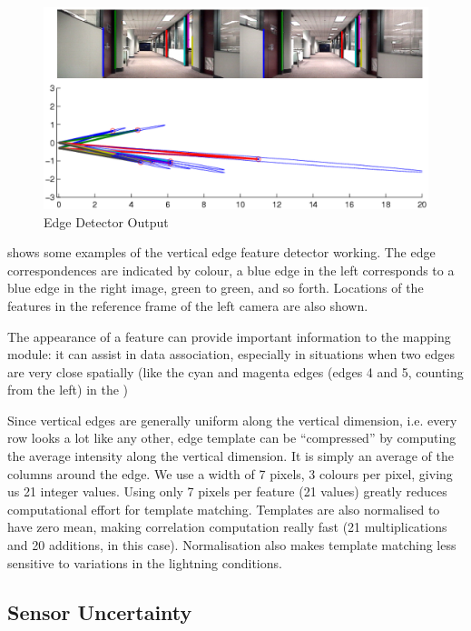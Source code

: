 \begin{figure}[htbp]
  \centering
  \includegraphics[width=13cm]{Pics/example_edge_detector}
  \caption{Edge Detector Output}
  \label{fig:example_edge_detector}
\end{figure}

 shows some examples of
the vertical edge feature detector working. The edge correspondences
are indicated by colour, a blue edge in the left corresponds to a blue
edge in the right image, green to green, and so forth. Locations of
the features in the reference frame of the left camera are also shown.

The appearance of a feature can provide important information to
the mapping module: it can assist in data association, especially in
situations when two edges are very close spatially (like the cyan and
magenta edges (edges 4 and 5, counting from the left) in the
)

Since vertical edges are generally uniform along the vertical
dimension, i.e. every row looks a lot like any other, edge template
can be ``compressed'' by computing the average intensity along the
vertical dimension. It is simply an average of the columns around the
edge. We use a width of 7 pixels, 3 colours per pixel, giving us 21
integer values. Using only 7 pixels per feature (21 values) greatly
reduces computational effort for template matching.  Templates are
also normalised to have zero mean, making correlation computation
really fast (21 multiplications and 20 additions, in this
case). Normalisation also makes template matching less sensitive to
variations in the lightning conditions.

\subsection{Sensor Uncertainty}

